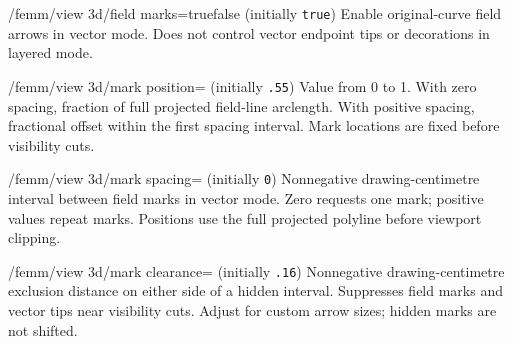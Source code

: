 \begin{key}{/femm/view 3d/field marks=true\textbar false (initially \texttt{true})}
Enable original-curve field arrows in vector mode. Does not control vector endpoint tips or decorations in layered mode.
\end{key}
\begin{key}{/femm/view 3d/mark position= (initially \texttt{.55})}
Value from 0 to 1. With zero spacing, fraction of full projected field-line arclength. With positive spacing, fractional offset within the first spacing interval. Mark locations are fixed before visibility cuts.
\end{key}
\begin{key}{/femm/view 3d/mark spacing= (initially \texttt{0})}
Nonnegative drawing-centimetre interval between field marks in vector mode. Zero requests one mark; positive values repeat marks. Positions use the full projected polyline before viewport clipping.
\end{key}
\begin{key}{/femm/view 3d/mark clearance= (initially \texttt{.16})}
Nonnegative drawing-centimetre exclusion distance on either side of a hidden interval. Suppresses field marks and vector tips near visibility cuts. Adjust for custom arrow sizes; hidden marks are not shifted.
\end{key}

